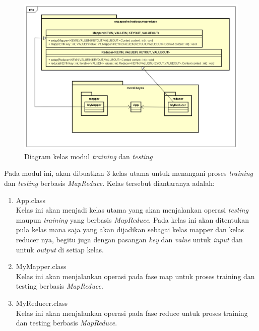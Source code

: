 \begin{figure}[H]
	\centering
	\includegraphics[scale=0.54]{ClassDiagram/Class_Diagram_Train_Test_MR}
	\caption[Diagram kelas modul \textit{training} dan \textit{testing}]{Diagram kelas modul \textit{training} dan \textit{testing}}
	\label{fig:Diagram kelas modul training dan testing}
\end{figure}

Pada modul ini, akan dibuatkan 3 kelas utama untuk menangani proses \textit{training} dan \textit{testing} berbasis \textit{MapReduce}. Kelas tersebut diantaranya adalah: 

\begin{enumerate}
\item{App.class} \\
Kelas ini akan menjadi kelas utama yang akan menjalankan operasi \textit{testing} maupun \textit{training} yang berbasis \textit{MapReduce}. Pada kelas ini akan ditentukan pula kelas mana saja yang akan dijadikan sebagai kelas mapper dan kelas reducer nya, begitu juga dengan pasangan \textit{key} dan \textit{value} untuk \textit{input} dan untuk \textit{output} di setiap kelas.
\item{MyMapper.class} \\
Kelas ini akan menjalankan operasi pada fase map untuk proses training dan testing berbasis \textit{MapReduce}.
\item{MyReducer.class} \\
Kelas ini akan menjalankan operasi pada fase reduce untuk proses training dan testing berbasis \textit{MapReduce}.
\end{enumerate}

